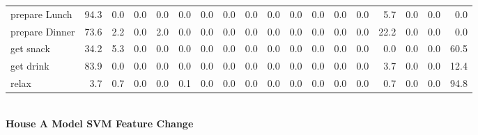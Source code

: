 \documentclass{article}
\begin{document}
\begin{sideways}
\begin{tabular}{lrrrrrrrrrrrrrrrrr}
prepare Lunch         &        94.3 &                0.0 &           0.0 &                          0.0 &                0.0 &                0.0 &                        0.0 &          0.0 &              0.0 &                0.0 &                    0.0 &                      0.0 &                  0.0 &                   5.7 &              0.0 &              0.0 &          0.0 \\
prepare Dinner        &        73.6 &                2.2 &           0.0 &                          2.0 &                0.0 &                0.0 &                        0.0 &          0.0 &              0.0 &                0.0 &                    0.0 &                      0.0 &                  0.0 &                  22.2 &              0.0 &              0.0 &          0.0 \\
get snack             &        34.2 &                5.3 &           0.0 &                          0.0 &                0.0 &                0.0 &                        0.0 &          0.0 &              0.0 &                0.0 &                    0.0 &                      0.0 &                  0.0 &                   0.0 &              0.0 &              0.0 &         60.5 \\
get drink             &        83.9 &                0.0 &           0.0 &                          0.0 &                0.0 &                0.0 &                        0.0 &          0.0 &              0.0 &                0.0 &                    0.0 &                      0.0 &                  0.0 &                   3.7 &              0.0 &              0.0 &         12.4 \\
relax                 &         3.7 &                0.7 &           0.0 &                          0.0 &                0.1 &                0.0 &                        0.0 &          0.0 &              0.0 &                0.0 &                    0.0 &                      0.0 &                  0.0 &                   0.7 &              0.0 &              0.0 &         94.8 \\
\bottomrule
\end{tabular}
\end{sideways}
\normalsize
\vspace{1cm}\\
\textbf{House A Model SVM Feature Change}\\
\vspace{1cm}\\
\end{document}
